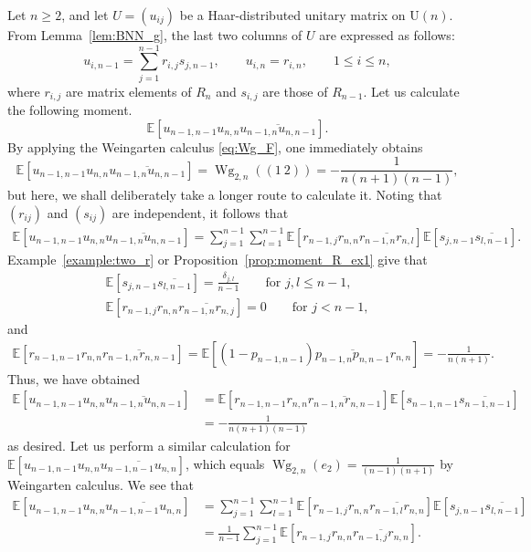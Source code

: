 \documentclass[pdftex]{sigma}
\numberwithin{equation}{section}
\theoremstyle{definition}
\newcommand{\UU}{\mathrm{U}}
\DeclareMathOperator{\Wg}{Wg}
\begin{document}
Let $n \ge 2$, and let $U=(u_{ij})$ be a Haar-distributed unitary matrix on $\UU(n)$.
From Lem\-ma~\ref{lem:BNN_g}, the last two columns of $U$ are expressed as follows:
\[
u_{i,n-1} = \sum_{j=1}^{n-1} r_{i,j} s_{j,n-1}, \qquad u_{i,n} =r_{i,n},
\qquad 1 \le i \le n,
\]
where $r_{i,j}$ are matrix elements of $R_n$ and $s_{i,j}$ are those of $R_{n-1}$.
Let us calculate the following moment.
\[
\mathbb{E} [ u_{n-1,n-1} u_{n,n} \overline{u_{n-1,n} u_{n, n-1}} ].
\]
By applying the Weingarten calculus \eqref{eq:Wg_F}, one immediately obtains
\[\mathbb{E} [ u_{n-1,n-1} u_{n,n} \overline{u_{n-1,n} u_{n, n-1}} ]=\Wg_{2,n}( (1 \ 2) ) = - \frac{1}{n(n+1)(n-1)},\]
but here, we shall deliberately take a longer route to calculate it.
Noting that $(r_{ij})$ and $(s_{ij})$ are independent, it follows that
\begin{align*}
 \mathbb{E} [ u_{n-1,n-1} u_{n,n} \overline{u_{n-1,n} u_{n, n-1}} ]
 =\sum_{j=1}^{n-1} \sum_{l=1}^{n-1} \mathbb{E} [r_{n-1,j} r_{n,n} \overline{r_{n-1,n} r_{n,l}}]
\mathbb{E}[s_{j,n-1} \overline{s_{l,n-1}}].
\end{align*}
Example~\ref{example:two_r} or Proposition~\ref{prop:moment_R_ex1} give that
\begin{gather*}
\mathbb{E}[s_{j,n-1} \overline{s_{l,n-1}}] = \frac{\delta_{j,l}}{n-1} \qquad \text{for $j,l \le n-1$}, \\
\mathbb{E} [r_{n-1,j} r_{n,n} \overline{r_{n-1,n} r_{n,j}}] =0 \qquad \text{for $j<n-1$},
\end{gather*}
and
\begin{align*}
\mathbb{E} [r_{n-1,n-1} r_{n,n} \overline{r_{n-1,n} r_{n,n-1}}]
 = \mathbb{E} [ (1-p_{n-1,n-1}) \overline{p_{n-1,n}p_{n,n-1}} r_{n,n}]
 = -\frac{1}{n(n+1)}.
\end{align*}
Thus, we have obtained
\begin{align*}
 \mathbb{E} [ u_{n-1,n-1} u_{n,n} \overline{u_{n-1,n} u_{n, n-1}} ]
 &=\mathbb{E} [r_{n-1,n-1} r_{n,n} \overline{r_{n-1,n} r_{n,n-1}}]
\mathbb{E}[s_{n-1,n-1} \overline{s_{n-1,n-1}}] \\
 &= -\frac{1}{n(n+1)(n-1)}
\end{align*}
as desired.
Let us perform a similar calculation for $\mathbb{E} \left[ u_{n-1,n-1} u_{n,n} \overline{u_{n-1,n-1} u_{n, n}} \right]$, which equals $\Wg_{2,n}(e_2)=\frac{1}{(n-1)(n+1)}$ by Weingarten calculus.
We see that
\begin{align*}
\mathbb{E} [ u_{n-1,n-1} u_{n,n} \overline{u_{n-1,n-1} u_{n, n}} ]
&= \sum_{j=1}^{n-1} \sum_{l=1}^{n-1} \mathbb{E} [r_{n-1,j} r_{n,n} \overline{r_{n-1,l} r_{n,n}}]
\mathbb{E}[s_{j,n-1} \overline{s_{l,n-1}}] \\
&= \frac{1}{n-1} \sum_{j=1}^{n-1} \mathbb{E} [r_{n-1,j} r_{n,n} \overline{r_{n-1,j} r_{n,n}}].
\end{align*}
\end{document}
